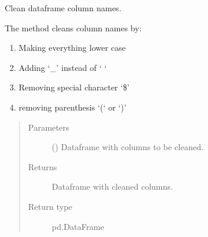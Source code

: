 \documentclass[letterpaper,10pt,english]{sphinxmanual}
\begin{document}
\begin{fulllineitems}
\label{\detokenize{source/optimization.datatools:optimization.datatools.dataprep.clean_names}}
Clean dataframe column names.

The method cleans column names by:
\begin{enumerate}
%
\item {} 
Making everything lower case

\item {} 
Adding ‘\_’ instead of ‘ ‘

\item {} 
Removing special character ‘\$’

\item {} 
removing parenthesis ‘(‘ or ‘)’

\end{enumerate}
\begin{quote}\begin{description}
\item[{Parameters}] \leavevmode
{} () \textendash{} Dataframe with columns to be cleaned.

\item[{Returns}] \leavevmode
{} \textendash{} Dataframe with cleaned columns.

\item[{Return type}] \leavevmode
pd.DataFrame

\end{description}\end{quote}

\end{fulllineitems}

\end{document}
